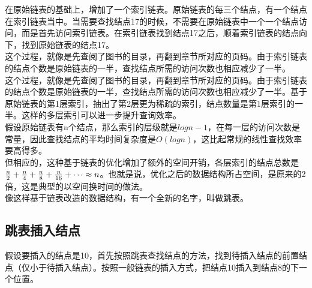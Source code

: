 在原始链表的基础上，增加了一个索引链表。原始链表的每三个结点，有一个结点在索引链表当中。当需要查找结点17的时候，不需要在原始链表中一个一个结点访问，而是首先访问索引链表。在索引链表找到结点17之后，顺着索引链表的结点向下，找到原始链表的结点17。 \\

这个过程，就像是先查阅了图书的目录，再翻到章节所对应的页码。由于索引链表的结点个数是原始链表的一半，查找结点所需的访问次数也相应减少了一半。 \\

这个过程，就像是先查阅了图书的目录，再翻到章节所对应的页码。由于索引链表的结点个数是原始链表的一半，查找结点所需的访问次数也相应减少了一半。基于原始链表的第1层索引，抽出了第2层更为稀疏的索引，结点数量是第1层索引的一半。这样的多层索引可以进一步提升查询效率。 \\

假设原始链表有n个结点，那么索引的层级就是$ logn - 1 $，在每一层的访问次数是常量，因此查找结点的平均时间复杂度是$ O(logn) $，这比起常规的线性查找效率要高得多。 \\

但相应的，这种基于链表的优化增加了额外的空间开销，各层索引的结点总数是$ {n \over 2} + {n \over 4} + {n \over 8} + {n \over 16} + \dots \approx n $。也就是说，优化之后的数据结构所占空间，是原来的2倍，这是典型的以空间换时间的做法。 \\

像这样基于链表改造的数据结构，有一个全新的名字，叫做跳表。

\subsection{跳表插入结点}

假设要插入的结点是10，首先按照跳表查找结点的方法，找到待插入结点的前置结点（仅小于待插入结点）。按照一般链表的插入方式，把结点10插入到结点8的下一个位置。 \\

